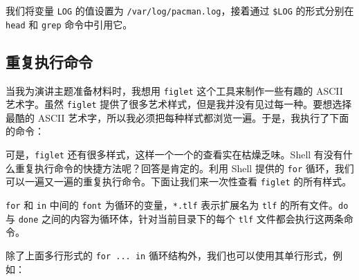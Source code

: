 \documentclass[]{ctexbook}
\newenvironment{Shaded}{\begin{snugshade}}{\end{snugshade}}
\newcommand{\BuiltInTok}[1]{#1}
\newcommand{\ExtensionTok}[1]{#1}
\newcommand{\FunctionTok}[1]{\textcolor[rgb]{0.00,0.00,0.00}{#1}}
\newcommand{\KeywordTok}[1]{\textcolor[rgb]{0.13,0.29,0.53}{\textbf{#1}}}
\newcommand{\NormalTok}[1]{#1}
\newcommand{\OperatorTok}[1]{\textcolor[rgb]{0.81,0.36,0.00}{\textbf{#1}}}
\newcommand{\StringTok}[1]{\textcolor[rgb]{0.31,0.60,0.02}{#1}}
\newcommand{\VariableTok}[1]{\textcolor[rgb]{0.00,0.00,0.00}{#1}}
\begin{document}
我们将变量 \texttt{LOG} 的值设置为 \texttt{/var/log/pacman.log}，接着通过 \texttt{\$LOG} 的形式分别在 \texttt{head} 和 \texttt{grep} 命令中引用它。

\hypertarget{ux91cdux590dux6267ux884cux547dux4ee4}{%
\subsection{重复执行命令}\label{ux91cdux590dux6267ux884cux547dux4ee4}}

当我为演讲主题准备材料时，我想用 \texttt{figlet} 这个工具来制作一些有趣的 ASCII 艺术字。虽然 \texttt{figlet} 提供了很多艺术样式，但是我并没有见过每一种。要想选择最酷的 ASCII 艺术字，所以我必须把每种样式都浏览一遍。于是，我执行了下面的命令：

\begin{Shaded}
\end{Shaded}

可是，\texttt{figlet} 还有很多样式，这样一个一个的查看实在枯燥乏味。Shell 有没有什么重复执行命令的快捷方法呢？回答是肯定的。利用 Shell 提供的 \texttt{for} 循环，我们可以一遍又一遍的重复执行命令。下面让我们来一次性查看 \texttt{figlet} 的所有样式。

\begin{Shaded}
\end{Shaded}

\texttt{for} 和 \texttt{in} 中间的 \texttt{font} 为循环的变量，\texttt{*.tlf} 表示扩展名为 \texttt{tlf} 的所有文件。\texttt{do} 与 \texttt{done} 之间的内容为循环体，针对当前目录下的每个 \texttt{tlf} 文件都会执行这两条命令。

除了上面多行形式的 \texttt{for\ ...\ in} 循环结构外，我们也可以使用其单行形式，例如：
\end{document}
